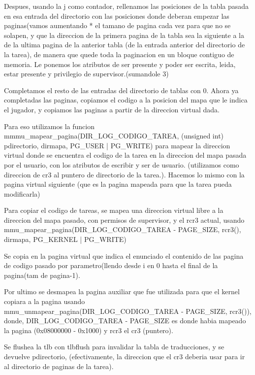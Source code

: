 \documentclass[a4paper]{article}
\begin{document}
Despues,  usando la j como contador, rellenamos las posiciones de la tabla pasada en esa entrada del directorio con las posiciones donde deberan empezar las paginas(vamos aumentando * el tamano de pagina cada vez para que no se solapen, y que la direccion de la primera pagina de la tabla sea la siguiente a la de la ultima pagina de la anterior tabla (de la entrada anterior del directorio de la tarea), de manera que quede toda la paginacion en un bloque contiguo de memoria.
 Le ponemos los atributos de ser presente y poder ser escrita, leida,  estar presente y privilegio de supervisor.(sumandole 3)
 
Completamos el resto de las entradas del directorio de tablas con 0. 
Ahora ya completadas las paginas,  copiamos el codigo a la posicion del mapa que le indica el jugador, y copiamos las paginas a partir de la direccion virtual dada.


 Para eso utilizamos la funcion mmmu_mapear_pagina(DIR_LOG_CODIGO_TAREA, (unsigned int) pdirectorio, dirmapa, PG_USER | PG_WRITE) para mapear la direccion virtual donde se encuentra el codigo de la tarea en la direccion del mapa pasada por el usuario, con los atributos de escribir y ser de usuario. (utilizamos como direccion de cr3 al puntero de directorio de la tarea.). Hacemos lo mismo con la pagina virtual siguiente (que es la pagina mapeada para  que la tarea pueda modificarla)
 
Para copiar el codigo de tareas, se mapea una direccion virtual libre a la direccion del mapa pasado, con permisos de supervisor, y el rcr3 actual, usando mmu_mapear_pagina(DIR_LOG_CODIGO_TAREA - PAGE_SIZE, rcr3(), dirmapa, PG_KERNEL | PG_WRITE)
  
Se copia en la pagina virtual que indica el enunciado el contenido de las pagina de codigo pasado por parametro(llendo desde i en  0 hasta el final de la pagina(tam de pagina-1). 

Por ultimo se desmapea la pagina auxiliar que fue utilizada para que el kernel copiara a la pagina usando mmu_unmapear_pagina(DIR_LOG_CODIGO_TAREA - PAGE_SIZE, rcr3()), donde,  DIR_LOG_CODIGO_TAREA - PAGE_SIZE es donde habia mapeado la pagina (0x08000000 - 0x1000) y rcr3 el cr3 (puntero).


Se flushea la tlb con tlbflush para invalidar la tabla de traducciones, y se devuelve pdirectorio, (efectivamente, la direccion que el cr3 deberia usar para ir al directorio de paginas de la tarea).\\
\end{document}
